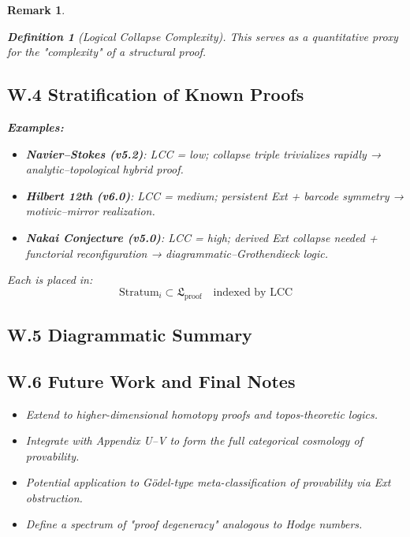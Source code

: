 \documentclass[11pt]{article}
\newtheorem{definition}[theorem]{Definition}
\newtheorem{remark}[theorem]{Remark}
\begin{document}
\begin{remark}
\begin{definition}[Logical Collapse Complexity]
This serves as a quantitative proxy for the "complexity" of a structural proof.
\end{definition}

\subsection*{W.4 Stratification of Known Proofs}

\textbf{Examples:}

\begin{itemize}
  \item \textbf{Navier–Stokes (v5.2)}: LCC = low; collapse triple trivializes rapidly → analytic–topological hybrid proof.
  \item \textbf{Hilbert 12th (v6.0)}: LCC = medium; persistent Ext + barcode symmetry → motivic–mirror realization.
  \item \textbf{Nakai Conjecture (v5.0)}: LCC = high; derived Ext collapse needed + functorial reconfiguration → diagrammatic–Grothendieck logic.
\end{itemize}

Each is placed in:
\[
\mathrm{Stratum}_i \subset \mathfrak{L}_{\mathrm{proof}} \quad \text{indexed by } \mathrm{LCC}
\]

\subsection*{W.5 Diagrammatic Summary}

\vspace{1em}
\begin{center}
\end{center}
\vspace{1em}

\subsection*{W.6 Future Work and Final Notes}

\begin{itemize}
  \item Extend to higher-dimensional homotopy proofs and topos-theoretic logics.
  \item Integrate with Appendix U–V to form the full categorical cosmology of provability.
  \item Potential application to Gödel-type meta-classification of provability via Ext obstruction.
  \item Define a spectrum of "proof degeneracy" analogous to Hodge numbers.
\end{itemize}


\end{remark}
\end{document}
